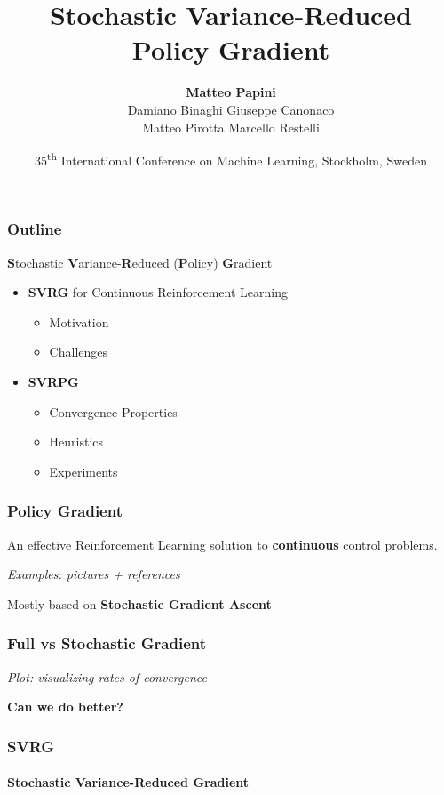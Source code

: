 \documentclass[aspectratio=169]{beamer}
\title{Stochastic Variance-Reduced Policy Gradient}
\date[ICML 2018]{\small{35\textsuperscript{th} International Conference on Machine Learning, Stockholm, Sweden}}
\author[Papini et al.]{\textbf{Matteo Papini} \\
						\small{Damiano Binaghi \quad Giuseppe Canonaco \\
								Matteo Pirotta \quad Marcello Restelli}}
\newcommand{\enb}[1]{\textcolor{poliblue1}{\textbf{#1}}}
\newcommand{\soft}[1]{\textcolor{softblue}{#1}}
\begin{document}
\begin{frame}
\titlepage
\end{frame}

\begin{frame} 
\frametitle{Outline} 

\begin{center}
	\Large{\enb{S}\soft{tochastic}
		\enb{V}\soft{ariance-}}\enb{R}\soft{educed}
	\soft{(}\enb{P}\soft{olicy}\soft{)}
	\enb{G}\soft{radient}
\end{center}


\begin{itemize}
	\item \enb{SVRG} for Continuous Reinforcement Learning
		\begin{itemize}
		\item Motivation
		\item Challenges
	\end{itemize}
	\item \enb{SVRPG}
	\begin{itemize}
		\item Convergence Properties
		\item Heuristics
		\item Experiments
	\end{itemize}
\end{itemize}

\end{frame}

\begin{frame} 
\frametitle{Policy Gradient} 
An effective Reinforcement Learning solution to \enb{continuous} control problems.

\textit{Examples: pictures + references}

Mostly based on \enb{Stochastic Gradient Ascent} 

\end{frame}

\begin{frame} 
\frametitle{Full vs Stochastic Gradient} 

\textit{Plot: visualizing rates of convergence}

\Large{\enb{Can we do better?}}

\end{frame}

\begin{frame} 
\frametitle{SVRG} 
\framesubtitle{Stochastic Variance-Reduced Gradient}

\end{frame}
\end{document}
